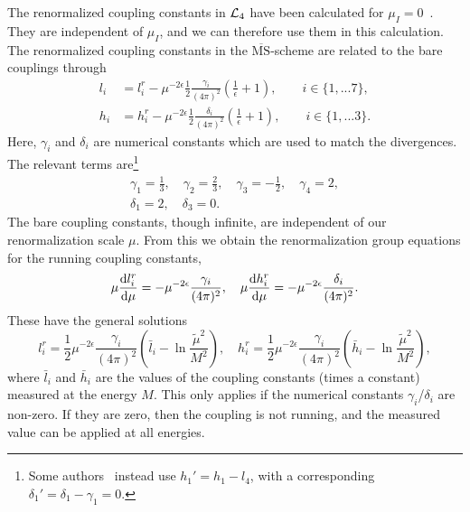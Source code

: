 The renormalized coupling constants in $\mathcal{L}_4$ have been calculated for $\mu_I = 0$~\cite{Gasser-Leutwyler:chiral}.
They are independent of $\mu_I$, and we can therefore use them in this calculation.
The renormalized coupling constants in the $\overline{\mathrm{MS}}$-scheme are related to the bare couplings through
\begin{align}
    l_i 
    & = 
    l_i^r 
    - \mu^{-2\epsilon}\frac{1}{2} \frac{\gamma_i }{(4 \pi)^2} 
    \left(\frac{1}{\epsilon} + 1 \right),
    \quad \quad
    i \in \{1, ... 7\},
    \\
    h_i 
    & = 
    h_i^r
    - \mu^{-2\epsilon} \frac{1}{2}  \frac{\delta_i }{(4 \pi)^2} 
    \left(\frac{1}{\epsilon} + 1 \right), 
    \quad \quad
    i \in \{1, ... 3\}.
\end{align}
Here, $\gamma_i$ and $\delta_i$ are numerical constants which are used to match the divergences.
The relevant terms are\footnote{Some authors~\cite{Andersen:two-flavor-chpt,GERBER1989387} instead use $h_1' = h_1 - l_4$, with a corresponding $\delta_1' = \delta_1 - \gamma_1 = 0$.}
\begin{gather}
    \gamma_1 = \frac{1}{3}, \quad
    \gamma_2 = \frac{2}{3}, \quad
    \gamma_3 = - \frac{1}{2}, \quad
    \gamma_4 = 2, \\
    \delta_1 = 2, \quad
    \delta_3 = 0.
\end{gather}
The bare coupling constants, though infinite, are independent of our renormalization scale $\mu$.
From this we obtain the renormalization group equations for the running coupling constants,
\begin{equation}
    \mu \diff{l_i^r}{\mu } = - \mu^{-2\epsilon} \frac{\gamma_i }{(4 \pi)^2}, \quad
    \mu \diff{h_i^r}{\mu } = -  \mu^{-2\epsilon}\frac{\delta_i}{(4 \pi)^2}.
\end{equation}
These have the general solutions
\begin{equation}
    l_i^r 
    = \frac{1}{2} \mu^{-2\epsilon} \frac{\gamma_i}{(4 \pi)^2} 
    \left( \bar l_i - \ln{\frac{\tilde \mu^2}{M^2}} \right),
    \quad
    h_i^r 
    = \frac{1}{2} \mu^{-2\epsilon} \frac{\gamma_i}{(4 \pi)^2} 
    \left( \bar h_i - \ln{\frac{\tilde \mu^2}{M^2}} \right),
\end{equation}
where $\bar l_i$ and $\bar h_i$ are the values of the coupling constants (times a constant) measured at the energy $M$.
This only applies if the numerical constants $\gamma_i$/$\delta_i$ are non-zero.
If they are zero, then the coupling is not running, and the measured value can be applied at all energies.
